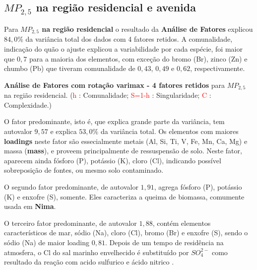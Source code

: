 

\subsection{$MP_{2,5}$ na região residencial e avenida}

Para \textbf{$MP_{2,5}$ na região residencial} o resultado da 
\textbf{Análise de Fatores}  explicou $84,0\%$ da variância total 
dos dados com 4 fatores retidos.
A comunalidade, indicação do quão o ajuste explicou a variabilidade por 
cada espécie, foi maior que $0,7$ para a maioria dos elementos,
com exceção do bromo (Br), zinco (Zn) e chumbo (Pb) que tiveram comunalidade 
de $0,43$, $0,49$ e $0,62$, respectivamente.

\begin{table}[H]
  \caption{\textbf{Análise de Fatores com rotação varimax - 4 fatores retidos} 
             para $MP_{2,5}$ na região residencial.
           (\textcolor{red}{h} : Comunalidade; 
           \textcolor{red}{S=1-h} : Singularidade; 
           \textcolor{red}{C} : Complexidade.)}
  
\end{table}

O fator predominante, isto é, que explica grande parte da variância, 
tem autovalor $9,57$ e explica $53,0\%$ da variância total.
Os elementos com maiores \textbf{loadings} neste fator são essecialmente 
metais (Al, Si, Ti, V, Fe, Mn, Ca, Mg) e massa (\textbf{mass}), e proveem 
principalmente de ressuspensão de solo.
Neste fator, aparecem ainda fósforo (P), potássio (K), cloro (Cl), indicando 
possível sobreposição de fontes, ou mesmo solo contaminado.

O segundo fator predominante, de autovalor $1,91$, agrega fósforo (P), 
potássio (K) e enxofre (S), somente. Eles caracteriza a queima de biomassa, 
comumente usada em \textbf{Nima}.

O terceiro fator predominante, de autovalor $1,88$, contém elementos
característicos de mar, sódio (Na), cloro (Cl), bromo (Br) e enxofre (S), 
sendo o sódio (Na) de maior loading $0,81$. 
Depois de um tempo de residência na atmosfera, o Cl do sal marinho envelhecido 
é substituído por $SO_4^{2-}$ como resultado da reação com acido sulfurico e 
ácido nitrico \citep{mcinnes1994}. 


